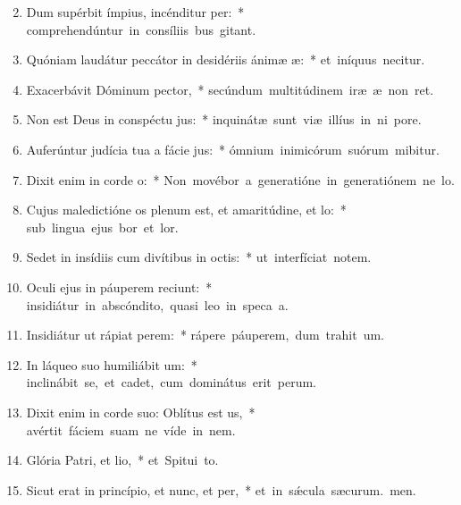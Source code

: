 \begin{flushleft}
\begin{enumerate}[leftmargin=*]
\setcounter{enumi}{1}

\item Dum supérbit ímpius, incénditur per:~* \mbox{comprehendúntur in consíliis bus gitant.}

\item Quóniam laudátur peccátor in desidériis ánimæ æ:~* \mbox{et iníquus necitur.}

\item Exacerbávit Dóminum pector,~* \mbox{secúndum multitúdinem iræ æ non ret.}

\item Non est Deus in conspéctu jus:~* \mbox{inquinátæ sunt viæ illíus in ni pore.}

\item Auferúntur judícia tua a fácie jus:~* \mbox{ómnium inimicórum suórum mibitur.}

\item Dixit enim in corde o:~* \mbox{Non movébor a generatióne in generatiónem ne lo.}

\item Cujus maledictióne os plenum est, et amaritúdine, et lo:~* \mbox{sub lingua ejus bor et lor.}

\item Sedet in insídiis cum divítibus in octis:~* \mbox{ut interfíciat notem.}

\item Oculi ejus in páuperem reciunt:~* \mbox{insidiátur in abscóndito, quasi leo in speca a.}

\item Insidiátur ut rápiat perem:~* \mbox{rápere páuperem, dum trahit um.}

\item In láqueo suo humiliábit um:~* \mbox{inclinábit se, et cadet, cum dominátus erit perum.}

\item Dixit enim in corde suo: Oblítus est us,~* \mbox{avértit fáciem suam ne víde in nem.}

\item Glória Patri, et lio,~* \mbox{et Spitui to.}

\item Sicut erat in princípio, et nunc, et per,~* \mbox{et in s\'{\ae}cula sæcurum. men.}

\end{enumerate}
\end{flushleft}

